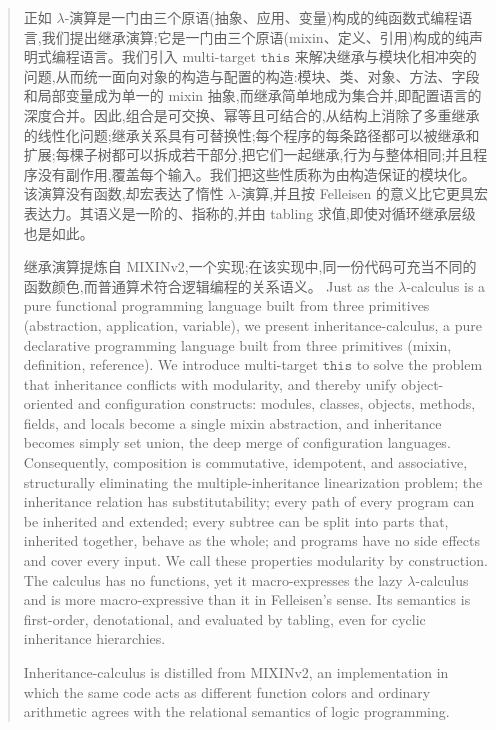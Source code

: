 \begin{CJK*}{UTF8}{gbsn}
\begin{abstract}
\ifPaperChinese
  正如 $\lambda$-演算是一门由三个原语(抽象、应用、变量)构成的纯函数式编程语言,我们提出继承演算;它是一门由三个原语(mixin、定义、引用)构成的纯声明式编程语言。我们引入 multi-target $\mathtt{this}$ 来解决继承与模块化相冲突的问题,从而统一面向对象的构造与配置的构造:模块、类、对象、方法、字段和局部变量成为单一的 mixin 抽象,而继承简单地成为集合并,即配置语言的深度合并。因此,组合是可交换、幂等且可结合的,从结构上消除了多重继承的线性化问题;继承关系具有可替换性;每个程序的每条路径都可以被继承和扩展;每棵子树都可以拆成若干部分,把它们一起继承,行为与整体相同;并且程序没有副作用,覆盖每个输入。我们把这些性质称为由构造保证的模块化。该演算没有函数,却宏表达了惰性 $\lambda$-演算,并且按 Felleisen 的意义比它更具宏表达力。其语义是一阶的、指称的,并由 tabling 求值,即使对循环继承层级也是如此。

  继承演算提炼自 MIXINv2,一个实现;在该实现中,同一份代码可充当不同的函数颜色,而普通算术符合逻辑编程的关系语义。
\else
  Just as the $\lambda$-calculus is a pure functional programming language built from three primitives (abstraction, application, variable), we present inheritance-calculus, a pure declarative programming language built from three primitives (mixin, definition, reference). We introduce multi-target $\mathtt{this}$ to solve the problem that inheritance conflicts with modularity, and thereby unify object-oriented and configuration constructs: modules, classes, objects, methods, fields, and locals become a single mixin abstraction, and inheritance becomes simply set union, the deep merge of configuration languages. Consequently, composition is commutative, idempotent, and associative, structurally eliminating the multiple-inheritance linearization problem; the inheritance relation has substitutability; every path of every program can be inherited and extended; every subtree can be split into parts that, inherited together, behave as the whole; and programs have no side effects and cover every input. We call these properties modularity by construction. The calculus has no functions, yet it macro-expresses the lazy $\lambda$-calculus and is more macro-expressive than it in Felleisen's sense. Its semantics is first-order, denotational, and evaluated by tabling, even for cyclic inheritance hierarchies.

  Inheritance-calculus is distilled from MIXINv2, an implementation in which the same code acts as different function colors and ordinary arithmetic agrees with the relational semantics of logic programming.
\fi
\end{abstract}


\end{CJK*}

